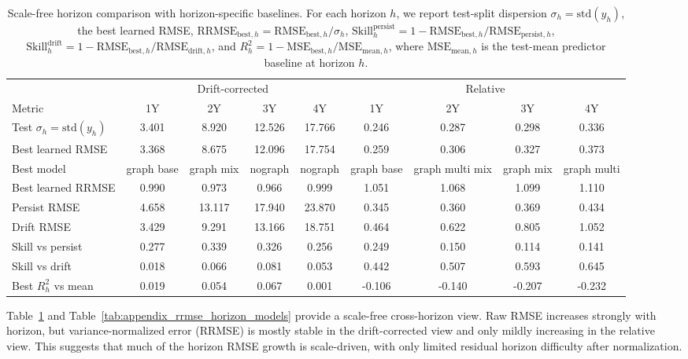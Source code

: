 \documentclass[pdflatex,sn-basic]{sn-jnl}
\begin{document}
\begin{table}[H]
\centering
\caption{Scale-free horizon comparison with horizon-specific baselines. For each horizon $h$, we report test-split dispersion $\sigma_h=\mathrm{std}(y_h)$, the best learned RMSE, $\mathrm{RRMSE}_{\mathrm{best},h}=\mathrm{RMSE}_{\mathrm{best},h}/\sigma_h$, $\mathrm{Skill}^{\mathrm{persist}}_h=1-\mathrm{RMSE}_{\mathrm{best},h}/\mathrm{RMSE}_{\mathrm{persist},h}$, $\mathrm{Skill}^{\mathrm{drift}}_h=1-\mathrm{RMSE}_{\mathrm{best},h}/\mathrm{RMSE}_{\mathrm{drift},h}$, and $R_h^2=1-\mathrm{MSE}_{\mathrm{best},h}/\mathrm{MSE}_{\mathrm{mean},h}$, where $\mathrm{MSE}_{\mathrm{mean},h}$ is the test-mean predictor baseline at horizon $h$.}
\label{tab:appendix_scale_free_horizon}
\small
\setlength{\tabcolsep}{4pt}
\begin{tabular}{lcccccccc}
\toprule
& \multicolumn{4}{c}{Drift-corrected} & \multicolumn{4}{c}{Relative} \\
Metric & 1Y & 2Y & 3Y & 4Y & 1Y & 2Y & 3Y & 4Y \\
\midrule
Test $\sigma_h=\mathrm{std}(y_h)$ & 3.401 & 8.920 & 12.526 & 17.766 & 0.246 & 0.287 & 0.298 & 0.336 \\
Best learned RMSE & 3.368 & 8.675 & 12.096 & 17.754 & 0.259 & 0.306 & 0.327 & 0.373 \\
Best model & graph base & graph mix & nograph & nograph & graph base & graph multi mix & graph mix & graph multi \\
Best learned RRMSE & 0.990 & 0.973 & 0.966 & 0.999 & 1.051 & 1.068 & 1.099 & 1.110 \\
Persist RMSE & 4.658 & 13.117 & 17.940 & 23.870 & 0.345 & 0.360 & 0.369 & 0.434 \\
Drift RMSE & 3.429 & 9.291 & 13.166 & 18.751 & 0.464 & 0.622 & 0.805 & 1.052 \\
Skill vs persist & 0.277 & 0.339 & 0.326 & 0.256 & 0.249 & 0.150 & 0.114 & 0.141 \\
Skill vs drift & 0.018 & 0.066 & 0.081 & 0.053 & 0.442 & 0.507 & 0.593 & 0.645 \\
Best $R_h^2$ vs mean & 0.019 & 0.054 & 0.067 & 0.001 & -0.106 & -0.140 & -0.207 & -0.232 \\
\bottomrule
\end{tabular}
\end{table}

Table~\ref{tab:appendix_scale_free_horizon} and Table~\ref{tab:appendix_rrmse_horizon_models} provide a scale-free cross-horizon view. Raw RMSE increases strongly with horizon, but variance-normalized error (RRMSE) is mostly stable in the drift-corrected view and only mildly increasing in the relative view. This suggests that much of the horizon RMSE growth is scale-driven, with only limited residual horizon difficulty after normalization.
\end{document}
